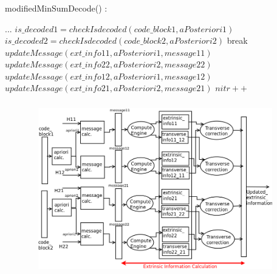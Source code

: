 \documentclass[xcolor=dvipsname]
{beamer}
\begin{document}
\begin{frame}[t]
\frametitle{  }                                 %
\alert{ modifiedMinSumDecode()	: }
\begin{algorithmic}   
\STATE ...  
\STATE$is\_decoded1 = checkIsdecoded( code\_block1 , aPosteriori1 ) $
\STATE$is\_decoded2 = checkIsdecoded( code\_block2 , aPosteriori2 ) $              
        	\STATE break 
    	\ELSE
        	\STATE $updateMessage(ext\_info11 ,aPosteriori1 ,message11)$
        	\STATE $updateMessage(ext\_info22 ,aPosteriori2 ,message22)$
        	\STATE $updateMessage(ext\_info12 ,aPosteriori1 ,message12)$
        	\STATE $updateMessage(ext\_info21 ,aPosteriori2 ,message21)$
     	\ENDIF 
\STATE $nitr++$  
 \ENDWHILE    


  		
\end{algorithmic}
\end{frame}

\begin{frame}[t]
\frametitle{  }  
\begin{figure}
       \includegraphics[height=7cm,width=11cm]{minSumModified}
       \end{figure}
\end{frame}
\end{document}
